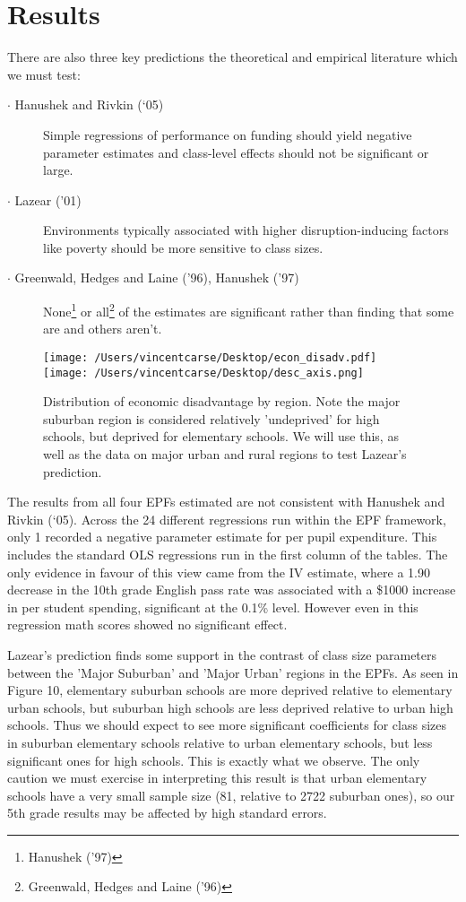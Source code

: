 \documentclass[11pt]{article}
\begin{document}
\section{Results}

There are also three key predictions the theoretical and empirical literature which we must test:  

\begin{description}
  \item[$\cdot$ Hanushek and Rivkin (‘05)] Simple regressions of performance on funding should yield negative parameter estimates and class-level effects should not be significant or large. 
  \item[$\cdot$ Lazear ('01)] Environments typically associated  with higher disruption-inducing factors like poverty should be more sensitive to class sizes.
  \item[$\cdot$ Greenwald, Hedges and Laine ('96), Hanushek ('97)] None\footnote{Hanushek ('97)} or all\footnote{Greenwald, Hedges and Laine ('96)} of the estimates are significant rather than finding that some are and others aren't.
\end{description}

\begin{figure}
    \label{image-myimage}
    \texttt{[image: /Users/vincentcarse/Desktop/econ\_disadv.pdf]}
    \texttt{[image: /Users/vincentcarse/Desktop/desc\_axis.png]}
    \caption{Distribution of economic disadvantage by region. Note the major suburban region is considered relatively 'undeprived' for high schools, but deprived for elementary schools. We will use this, as well as the data on major urban and rural regions to test Lazear's prediction.}
\end{figure}

The results from all four EPFs estimated are not consistent with Hanushek and Rivkin (‘05). Across the 24 different regressions run within the EPF framework, only 1 recorded a negative parameter estimate for per pupil expenditure. This includes the standard OLS regressions run in the first column of the tables. The only evidence in favour of this view came from the IV estimate, where a 1.90 decrease in the 10th grade English pass rate was associated with a \$1000 increase in per student spending, significant at the 0.1\% level. However even in this regression math scores showed no significant effect. 

Lazear's prediction finds some support in the contrast of class size parameters between the 'Major Suburban' and 'Major Urban' regions in the EPFs. As seen in Figure 10, elementary suburban schools are more deprived relative to elementary urban schools, but suburban high schools are less deprived relative to urban high schools. Thus we should expect to see more significant coefficients for class sizes in suburban elementary schools relative to urban elementary schools, but less significant ones for high schools. This is exactly what we observe. The only caution we must exercise in interpreting this result is that urban elementary schools have a very small sample size (81, relative to 2722 suburban ones), so our 5th grade results may be affected by high standard errors.
\end{document}
